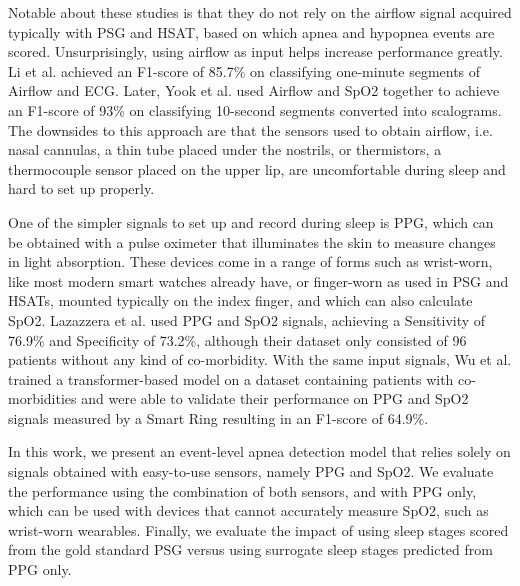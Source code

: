 Notable about these studies is that they do not rely on the airflow signal acquired typically with PSG and HSAT, based on which apnea and hypopnea events are scored. Unsurprisingly, using airflow as input helps increase performance greatly. Li et al. \cite{li2023deep} achieved an F1-score of 85.7\% on classifying one-minute segments of Airflow and ECG. Later, Yook et al. \cite{yook2024deep} used Airflow and SpO2 together to achieve an F1-score of 93\% on classifying 10-second segments converted into scalograms.
The downsides to this approach are that the sensors used to obtain airflow, i.e. nasal cannulas, a thin tube placed under the nostrils, or thermistors, a thermocouple sensor placed on the upper lip, are uncomfortable during sleep and hard to set up properly.

One of the simpler signals to set up and record during sleep is PPG, which can be obtained with a pulse oximeter that illuminates the skin to measure changes in light absorption.
These devices come in a range of forms such as wrist-worn, like most modern smart watches already have, or finger-worn as used in PSG and HSATs, mounted typically on the index finger, and which can also calculate SpO2.
Lazazzera et al. \cite {lazazzera2020detection} used PPG and SpO2 signals, achieving a Sensitivity of 76.9\% and Specificity of 73.2\%, although their dataset only consisted of 96 patients without any kind of co-morbidity. With the same input signals, Wu et al. \cite{wu2024transformer} trained a transformer-based model on a dataset containing patients with co-morbidities and were able to validate their performance on PPG and SpO2 signals measured by a Smart Ring resulting in an F1-score of 64.9\%.

In this work, we present an event-level apnea detection model that relies solely on signals obtained with easy-to-use sensors, namely PPG and SpO2. We evaluate the performance using the combination of both sensors, and with PPG only, which can be used with devices that cannot accurately measure SpO2, such as wrist-worn wearables. Finally, we evaluate the impact of using sleep stages scored from the gold standard PSG versus using surrogate sleep stages predicted from PPG only.
